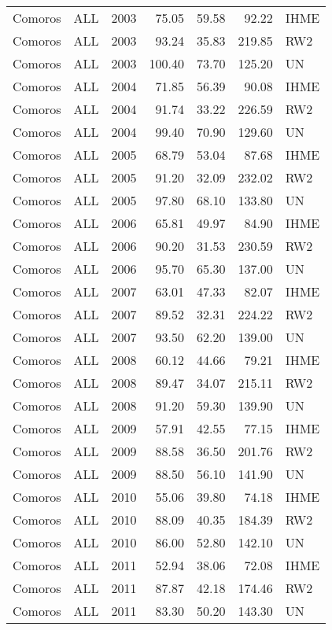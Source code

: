 \begin{longtable}{lllrrrl}
  Comoros & ALL & 2003 & 75.05 & 59.58 & 92.22 & IHME \\ 
  Comoros & ALL & 2003 & 93.24 & 35.83 & 219.85 & RW2 \\ 
  Comoros & ALL & 2003 & 100.40 & 73.70 & 125.20 & UN \\ 
  Comoros & ALL & 2004 & 71.85 & 56.39 & 90.08 & IHME \\ 
  Comoros & ALL & 2004 & 91.74 & 33.22 & 226.59 & RW2 \\ 
  Comoros & ALL & 2004 & 99.40 & 70.90 & 129.60 & UN \\ 
  Comoros & ALL & 2005 & 68.79 & 53.04 & 87.68 & IHME \\ 
  Comoros & ALL & 2005 & 91.20 & 32.09 & 232.02 & RW2 \\ 
  Comoros & ALL & 2005 & 97.80 & 68.10 & 133.80 & UN \\ 
  Comoros & ALL & 2006 & 65.81 & 49.97 & 84.90 & IHME \\ 
  Comoros & ALL & 2006 & 90.20 & 31.53 & 230.59 & RW2 \\ 
  Comoros & ALL & 2006 & 95.70 & 65.30 & 137.00 & UN \\ 
  Comoros & ALL & 2007 & 63.01 & 47.33 & 82.07 & IHME \\ 
  Comoros & ALL & 2007 & 89.52 & 32.31 & 224.22 & RW2 \\ 
  Comoros & ALL & 2007 & 93.50 & 62.20 & 139.00 & UN \\ 
  Comoros & ALL & 2008 & 60.12 & 44.66 & 79.21 & IHME \\ 
  Comoros & ALL & 2008 & 89.47 & 34.07 & 215.11 & RW2 \\ 
  Comoros & ALL & 2008 & 91.20 & 59.30 & 139.90 & UN \\ 
  Comoros & ALL & 2009 & 57.91 & 42.55 & 77.15 & IHME \\ 
  Comoros & ALL & 2009 & 88.58 & 36.50 & 201.76 & RW2 \\ 
  Comoros & ALL & 2009 & 88.50 & 56.10 & 141.90 & UN \\ 
  Comoros & ALL & 2010 & 55.06 & 39.80 & 74.18 & IHME \\ 
  Comoros & ALL & 2010 & 88.09 & 40.35 & 184.39 & RW2 \\ 
  Comoros & ALL & 2010 & 86.00 & 52.80 & 142.10 & UN \\ 
  Comoros & ALL & 2011 & 52.94 & 38.06 & 72.08 & IHME \\ 
  Comoros & ALL & 2011 & 87.87 & 42.18 & 174.46 & RW2 \\ 
  Comoros & ALL & 2011 & 83.30 & 50.20 & 143.30 & UN \\ 

\end{longtable}
